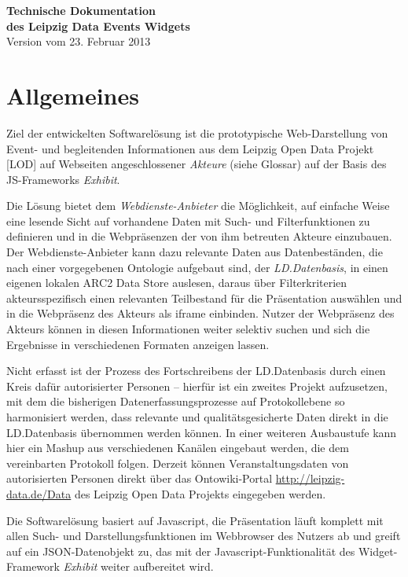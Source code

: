 \documentclass[11pt,a4paper]{article}
\begin{document}
\begin{center}
  \textbf{\Large Technische Dokumentation\\[.3em] des Leipzig Data Events
    Widgets}\\[1em] Version vom 23. Februar 2013
\end{center}

\section{Allgemeines}
Ziel der entwickelten Softwarelösung ist die prototypische Web-Darstellung von
Event- und begleitenden Informationen aus dem Leipzig Open Data Projekt [LOD]
auf Webseiten angeschlossener \emph{Akteure} (siehe Glossar) auf der Basis des
JS-Frameworks \emph{Exhibit}.

Die Lösung bietet dem \emph{Webdienste-Anbieter} die Möglichkeit, auf einfache
Weise eine lesende Sicht auf vorhandene Daten mit Such- und Filterfunktionen
zu definieren und in die Webpräsenzen der von ihm betreuten Akteure
einzubauen.  Der Webdienste-Anbieter kann dazu relevante Daten aus
Datenbeständen, die nach einer vorgegebenen Ontologie aufgebaut sind, der
\emph{LD.Datenbasis}, in einen eigenen lokalen ARC2 Data Store auslesen,
daraus über Filterkriterien akteursspezifisch einen relevanten Teilbestand für
die Präsentation auswählen und in die Webpräsenz des Akteurs als iframe
einbinden.  Nutzer der Webpräsenz des Akteurs können in diesen Informationen
weiter selektiv suchen und sich die Ergebnisse in verschiedenen Formaten
anzeigen lassen.

Nicht erfasst ist der Prozess des Fortschreibens der LD.Datenbasis durch einen
Kreis dafür autorisierter Personen -- hierfür ist ein zweites Projekt
aufzusetzen, mit dem die bisherigen Datenerfassungsprozesse auf Protokollebene
so harmonisiert werden, dass relevante und qualitätsgesicherte Daten direkt in
die LD.Datenbasis übernommen werden können. In einer weiteren Ausbaustufe kann
hier ein Mashup aus verschiedenen Kanälen eingebaut werden, die dem
vereinbarten Protokoll folgen.  Derzeit können Veranstaltungsdaten von
autorisierten Personen direkt über das Ontowiki-Portal
\url{http://leipzig-data.de/Data} des Leipzig Open Data Projekts eingegeben
werden.

Die Softwarelösung basiert auf Javascript, die Präsentation läuft komplett mit
allen Such- und Darstellungsfunktionen im Webbrowser des Nutzers ab und greift
auf ein JSON-Datenobjekt zu, das mit der Javascript-Funktionalität des
Widget-Framework \emph{Exhibit} weiter aufbereitet wird.
\end{document}
